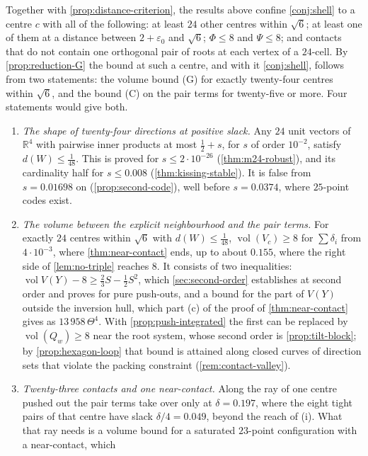 \documentclass[11pt,reqno]{amsart}
\renewcommand{\_}{\origunderscore\allowbreak}
\numberwithin{equation}{section}
\theoremstyle{plain}
\theoremstyle{definition}
\theoremstyle{remark}
\DeclareMathOperator{\vol}{vol}
\begin{document}
Together with \cref{prop:distance-criterion}, the results above confine
\cref{conj:shell} to a centre $c$ with all of the following: at least
$24$ other centres within $\sqrt6$; at least one of them at a distance
between $2+\varepsilon_0$ and $\sqrt6$; $\Phi\le8$ and $\Psi\le8$; and
contacts that do not contain one orthogonal pair of roots at each vertex
of a $24$-cell. By \cref{prop:reduction-G} the bound at such a centre, and
with it \cref{conj:shell}, follows from two statements: the volume bound
(G) for exactly twenty-four centres within $\sqrt6$, and the bound (C) on
the pair terms for twenty-five or more. Four statements would give both.
\begin{enumerate}[label=\textup{(\roman*)},leftmargin=2.2em]
\item \emph{The shape of twenty-four directions at positive slack.} Any
  $24$ unit vectors of $\mathbb{R}^4$ with pairwise inner products at most
  $\tfrac12+s$, for $s$ of order $10^{-2}$, satisfy $d(W)\le\frac1{48}$.
  This is proved for $s\le2\cdot10^{-26}$ (\cref{thm:m24-robust}), and its
  cardinality half for $s\le0.008$ (\cref{thm:kissing-stable}). It is
  false from $s=0.01698$ on (\cref{prop:second-code}), well before
  $s=0.0374$, where $25$-point codes exist.
\item \emph{The volume between the explicit neighbourhood and the pair
  terms.} For exactly $24$ centres within $\sqrt6$ with $d(W)\le\frac1{48}$,
  $\vol(V_c)\ge8$ for $\sum\delta_i$ from $4\cdot10^{-3}$, where
  \cref{thm:near-contact} ends, up to about $0.155$, where the right side
  of \cref{lem:no-triple} reaches $8$. It consists of two inequalities:
  $\vol V(Y)-8\ge\frac23S-\frac12S^2$, which \cref{sec:second-order}
  establishes at second order and proves for pure push-outs, and a bound
  for the part of $V(Y)$ outside the inversion hull, which part (c) of the
  proof of \cref{thm:near-contact} gives as $13\,958\,\Theta^4$. With
  \cref{prop:push-integrated} the first can be replaced by
  $\vol(Q_w)\ge8$ near the root system, whose second order is
  \cref{prop:tilt-block}; by \cref{prop:hexagon-loop} that bound is
  attained along closed curves of direction sets that violate the packing
  constraint (\cref{rem:contact-valley}).
\item \emph{Twenty-three contacts and one near-contact.} Along the ray of
  one centre pushed out the pair terms take over only at $\delta=0.197$,
  where the eight tight pairs of that centre have slack $\delta/4=0.049$,
  beyond the reach of (i). What that ray needs is a volume bound for a
  saturated $23$-point configuration with a near-contact, which

\end{enumerate}
\end{document}
